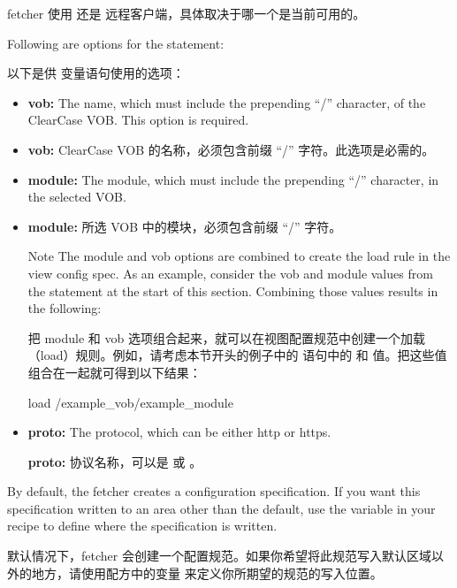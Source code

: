 fetcher 使用  还是  远程客户端，具体取决于哪一个是当前可用的。

Following are options for the  statement:

以下是供  变量语句使用的选项：

\begin{itemize}
\setlength\itemsep{1.0em}
\item \textbf{vob:} The name, which must include the prepending ``/'' character, of the ClearCase VOB. This option is required.
\item \textbf{vob:} ClearCase VOB 的名称，必须包含前缀 ``/'' 字符。此选项是必需的。

\item \textbf{module:} The module, which must include the prepending ``/'' character, in the selected VOB.
\item \textbf{module:} 所选 VOB 中的模块，必须包含前缀 ``/'' 字符。
\begin{noteblock}{Note}%
The module and vob options are combined to create the load rule in the view config spec. As an example, consider the vob and module values from the  statement at the start of this section. Combining those values results in the following:

\medskip
把 module 和 vob 选项组合起来，就可以在视图配置规范中创建一个加载（load）规则。例如，请考虑本节开头的例子中的  语句中的  和  值。把这些值组合在一起就可得到以下结果：

\begin{pyglist}
load /example_vob/example_module
\end{pyglist}
\end{noteblock}

\item \textbf{proto:} The protocol, which can be either http or https.

\medskip
\textbf{proto:} 协议名称，可以是  或 。
\end{itemize}

By default, the fetcher creates a configuration specification. If you want this specification written to an area other than the default, use the  variable in your recipe to define where the specification is written.

默认情况下，fetcher 会创建一个配置规范。如果你希望将此规范写入默认区域以外的地方，请使用配方中的变量  来定义你所期望的规范的写入位置。

